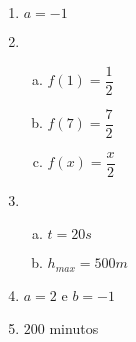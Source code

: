 \documentclass[12pt]{article}
\begin{document}
\begin{res}
\begin{multicols}{2}
\begin{enumerate}[(1)]
            \item $a=-1$

            \item
                \begin{enumerate}[(a)]
                    \item $f\left( 1\right)=\dfrac{1}{2}$
                    \item  $f\left( 7\right)=\dfrac{7}{2}$
                    \item  $f\left( x\right)=\dfrac{x}{2}$
                \end{enumerate}

            \item
                \begin{enumerate}[(a)]
                    \item $t=20s$
                    \item  $h_{max}=500m$
                \end{enumerate}

            \item $a=2$ e $b=-1$

            \item $200$ minutos

        \end{enumerate}
    \end{multicols}
\end{res}
\end{document}
